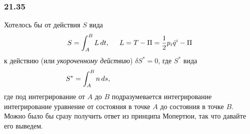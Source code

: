 \subsubsection*{21.35}

Хотелось бы от действия $S$ вида
\begin{equation*}
    S = \int_A^B L \, d t, \hspace{0.5cm} 
    L = T - \Pi = \frac{1}{2} p_i \dot{q}^i - \Pi
\end{equation*}
к действию (или \textit{укороченному действию}) $\delta S^* = 0$, где $S^*$ вида
\begin{equation}
\label{sample}
    S^* = \int_A^B n \d s, \hspace{0.5cm} 
    \phantom{
    L = T - \Pi = \frac{1}{2} p_i \dot{q}^i - \Pi
    }
\end{equation}
где под интегрирование от $A$ до $B$ подразумевается интегрирование интегрирование уравнение от состояния в точке $A$ до состояния в точке $B$. Можно было бы сразу получить ответ из принципа Мопертюи, так что давайте его выведем. 


